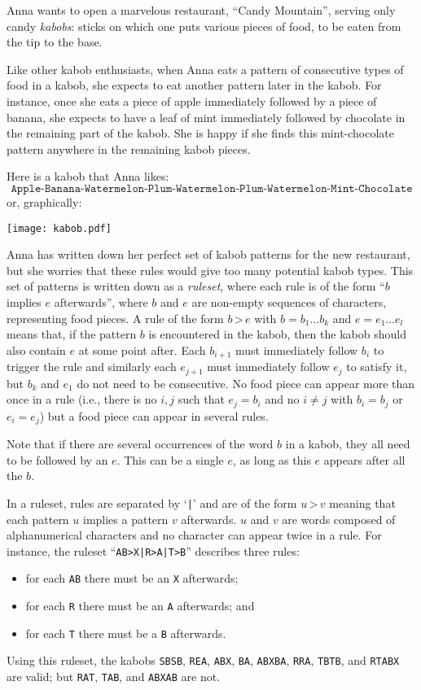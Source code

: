 
\noindent
Anna wants to open a marvelous restaurant, ``Candy Mountain'', serving only
candy \emph{kabobs}: sticks on which one puts various pieces of food, to be
eaten from the tip to the base.

Like other kabob enthusiasts,
when Anna eats a pattern of consecutive types of food in a kabob, she expects
to eat another pattern later in the kabob.
For instance, once she eats a
piece of apple immediately followed by a piece of banana, she expects to have a
leaf of mint immediately followed by chocolate in the remaining part of the
kabob.
She is
happy if she finds this mint-chocolate pattern anywhere in
the remaining kabob pieces.

Here is a kabob
 that Anna likes:
\[\texttt{Apple-Banana-Watermelon-Plum-Watermelon-Plum-Watermelon-Mint-Chocolate}\]
or, graphically:
\begin{center}
\texttt{[image: kabob.pdf]}
\end{center}

Anna has written down her perfect set of kabob patterns for the new
restaurant, but she worries that these rules would give too many
potential kabob types.  This set of patterns is written down as a
\emph{ruleset},
where each rule is of the form ``$b$ implies $e$ afterwards'', where $b$ and
$e$ are non-empty sequences of characters, representing food pieces. A
rule of the form $b\,\texttt{>}\,e$ with $b=b_1 \ldots b_k$ and $e=e_1 \ldots e_l$
means that, if the pattern $b$ is encountered in the kabob, then the
kabob should also contain $e$ at some point after. Each $b_{i+1}$ must
immediately follow $b_i$ to trigger the rule and similarly each $e_{j+1}$
must immediately follow $e_j$ to satisfy it, but $b_k$ and $e_1$ do
not need to be consecutive.
No food piece can appear more than once in a rule (i.e.,
there is no $i,j$ such that $e_j=b_i$ and no $i\neq j$ with $b_i=b_j$ or
$e_i=e_j$) but a food piece can appear in several rules.

Note that if there are several occurrences of the word $b$ in a kabob, they all
need to be followed by an $e$. This can be a single $e$,
as long as this $e$ appears after all the $b$.

In a ruleset, rules are separated by `\texttt{|}' and are of the
form $u\,\texttt{>}\,v$ meaning that each pattern $u$ implies a pattern $v$
afterwards. $u$ and $v$ are words composed of alphanumerical characters and no
character can appear twice in a rule.
For instance, the ruleset
``\texttt{AB>X|R>A|T>B}'' describes three rules:
\begin{itemize}
\item for each \texttt{AB} there must be an \texttt{X}
  afterwards;
\item for each \texttt{R} there must be an \texttt{A} afterwards; and
\item for each \texttt{T} there must be a \texttt{B} afterwards.
\end{itemize}
Using this ruleset, the kabobs
\texttt{SBSB}, \texttt{REA}, \texttt{ABX}, \texttt{BA}, \texttt{ABXBA}, \texttt{RRA}, \texttt{TBTB}, and
\texttt{RTABX} are valid; but \texttt{RAT}, \texttt{TAB}, and
\texttt{ABXAB} are not.

